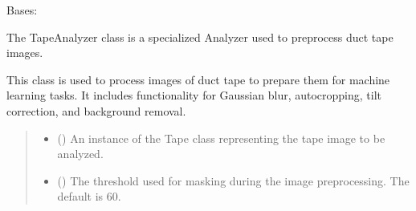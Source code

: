 \documentclass[letterpaper,10pt,english]{sphinxmanual}
\begin{document}
\begin{fulllineitems}
\label{\detokenize{forensicfit.core.tape:forensicfit.core.tape.TapeAnalyzer}}
\pysigstartsignatures
{}
\pysigstopsignatures
\sphinxAtStartPar
Bases: {\hyperref[\detokenize{forensicfit.core.analyzer:forensicfit.core.analyzer.Analyzer}]{}}

\sphinxAtStartPar
The TapeAnalyzer class is a specialized Analyzer used to preprocess duct tape images.

\sphinxAtStartPar
This class is used to process images of duct tape to prepare them for machine learning tasks.
It includes functionality for Gaussian blur, auto\sphinxhyphen{}cropping, tilt correction, and background removal.
\begin{quote}\begin{description}
\begin{itemize}
\item {} 
\sphinxAtStartPar
{} ({\hyperref[\detokenize{forensicfit.core.tape:forensicfit.core.tape.Tape}]{}}\sphinxstyleliteralemphasis{\sphinxupquote{, }}) \textendash{} An instance of the Tape class representing the tape image to be analyzed.

\item {} 
\sphinxAtStartPar
{} (\sphinxstyleliteralemphasis{\sphinxupquote{, }}) \textendash{} The threshold used for masking during the image preprocessing. The default is 60.


\end{itemize}
\end{description}
\end{quote}
\end{fulllineitems}
\end{document}
